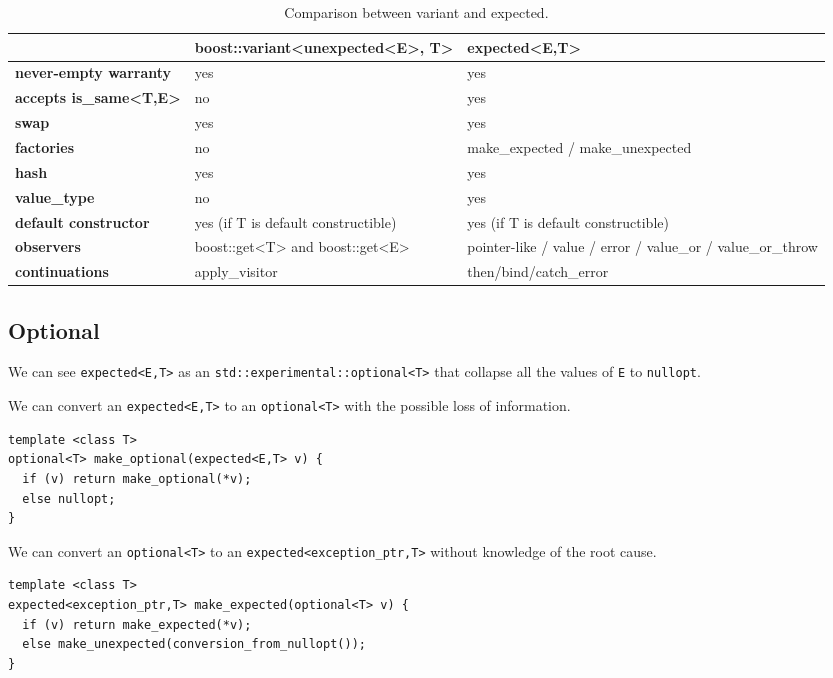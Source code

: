 \documentclass[a4paper,10pt]{article}
\newcommand{\cpp}[1]{\lstinline{#1}}
\begin{document}
\begin{table}
\bgroup
\def\arraystretch{1.5}
\begin{tabular}
{|l|>{\raggedright\arraybackslash}p{6cm}|>{\raggedright\arraybackslash}p{6cm}|}
\hline
                    & \textbf{boost::variant<unexpected<E>, T>} & \textbf{expected<E,T>}  \\
\hline
\textbf{never-empty warranty} & yes & yes \\
\hline
\textbf{accepts is_same<T,E>} & no & yes \\
\hline
\textbf{swap} & yes & yes \\
\hline
\textbf{factories} & no & make\_expected / make\_unexpected  \\
\hline
\textbf{hash} & yes & yes  \\
\hline
\textbf{value_type} & no & yes  \\
\hline
\textbf{default constructor} & yes (if T is default constructible) & yes (if T is default constructible)  \\
\hline
\textbf{observers} & boost::get<T> and boost::get<E> & pointer-like / value / error / value_or / value_or_throw \\
\hline
\textbf{continuations} & apply_visitor & then/bind/catch_error  \\
\hline
\end{tabular}
\egroup
\caption{Comparison between variant and expected.}
\label{comp-variant}
\end{table}


\subsection{Optional}

We can see \cpp{expected<E,T>} as an \cpp{std::experimental::optional<T>} that collapse all the values of \cpp{E} to \cpp{nullopt}. 

We can convert an \cpp{expected<E,T>} to an \cpp{optional<T>} with the possible loss of information.

\begin{lstlisting}
template <class T>
optional<T> make_optional(expected<E,T> v) {
  if (v) return make_optional(*v);
  else nullopt;
}
\end{lstlisting}

We can convert an \cpp{optional<T>} to an \cpp{expected<exception_ptr,T>} without knowledge of the root cause.

\begin{lstlisting}
template <class T>
expected<exception_ptr,T> make_expected(optional<T> v) {
  if (v) return make_expected(*v);
  else make_unexpected(conversion_from_nullopt());
}
\end{lstlisting}
\end{document}
